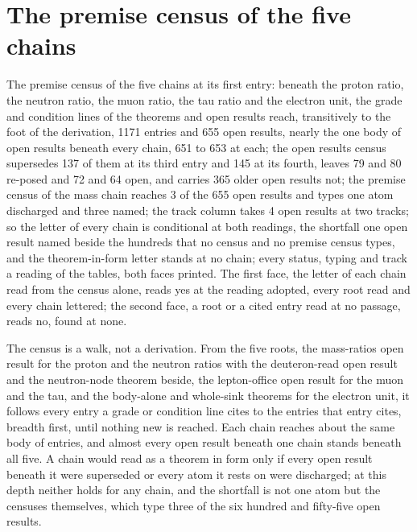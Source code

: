 \section{The premise census of the five chains}\label{mod:V-1-D539865-the-premise-census-of-the-five-chains}
\begin{chtable}\label{box:V-1-D539865-the-premise-census-of-the-five-chains:1}
The premise census of the five chains at its first entry: beneath the proton ratio, the neutron ratio, the muon ratio, the tau ratio and the electron unit, the grade and condition lines of the theorems and open results reach, transitively to the foot of the derivation, 1171 entries and 655 open results, nearly the one body of open results beneath every chain, 651 to 653 at each; the open results census supersedes 137 of them at its third entry and 145 at its fourth, leaves 79 and 80 re-posed and 72 and 64 open, and carries 365 older open results not; the premise census of the mass chain reaches 3 of the 655 open results and types one atom discharged and three named; the track column takes 4 open results at two tracks; so the letter of every chain is conditional at both readings, the shortfall one open result named beside the hundreds that no census and no premise census types, and the theorem-in-form letter stands at no chain; every status, typing and track a reading of the tables, both faces printed.
The first face, the letter of each chain read from the census alone, reads yes at the reading adopted, every root read and every chain lettered; the second face, a root or a cited entry read at no passage, reads no, found at none.
\end{chtable}
The census is a walk, not a derivation. From the five roots, the mass-ratios open result for the proton and the neutron ratios with the deuteron-read open result and the neutron-node theorem beside, the lepton-office open result for the muon and the tau, and the body-alone and whole-sink theorems for the electron unit, it follows every entry a grade or condition line cites to the entries that entry cites, breadth first, until nothing new is reached. Each chain reaches about the same body of entries, and almost every open result beneath one chain stands beneath all five. A chain would read as a theorem in form only if every open result beneath it were superseded or every atom it rests on were discharged; at this depth neither holds for any chain, and the shortfall is not one atom but the censuses themselves, which type three of the six hundred and fifty-five open results.
